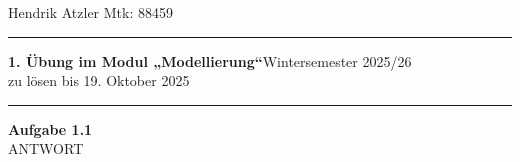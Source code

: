 \documentclass[a4paper,12pt]{article}
\begin{document}
Hendrik Atzler \hfill Mtk: 88459

\rule{\textwidth}{0.4pt}


{\textbf{1. Übung im Modul „Modellierung“}\hfill Wintersemester 2025/26} \\
zu lösen bis 19. Oktober 2025 \\
\rule{\textwidth}{0.4pt}

{\large{\textbf{Aufgabe 1.1}}} \\

ANTWORT
\end{document}
